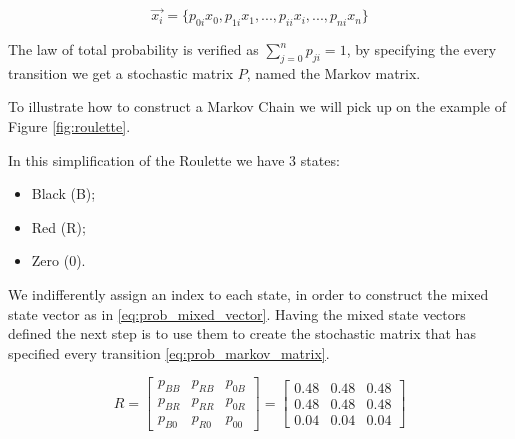 \begin{equation}
\label{eq:prob_mixed_vector}
\overrightarrow{x_{i}}  = \{ p_{0i}x_{0} , p_{1i}x_{1}, ... ,  p_{ii}x_{i}, ..., p_{ni}x_{n} \}
\end{equation}


The law of total probability is verified as $\sum_{j=0}^{n}p_{ji}=1$, by specifying the every transition we get a stochastic matrix $P$, named the Markov matrix.

To illustrate how to construct a Markov Chain we will pick up on the example of Figure \ref{fig:roulette}. 

In this simplification of the Roulette we have $3$ states:
\begin{itemize}
\item Black (B);
\item Red (R);
\item Zero (0).
\end{itemize}

We indifferently assign an index to each state, in order to construct the mixed state vector as in \ref{eq:prob_mixed_vector}. Having the mixed state vectors defined the next step is to use them to create the stochastic matrix that has specified every transition \ref{eq:prob_markov_matrix}.

\begin{equation}
\label{eq:prob_markov_matrix}
R=\left[\begin{array}{ccc}
p_{BB} & p_{RB} & p_{0B}\\
p_{BR} & p_{RR} & p_{0R}\\
p_{B0} &p_{R0}  & p_{00}
\end{array}\right] = \left[\begin{array}{ccc}
0.48 & 0.48 & 0.48\\
0.48 & 0.48 &0.48\\
0.04 &  0.04 & 0.04
\end{array}\right]
\end{equation}







